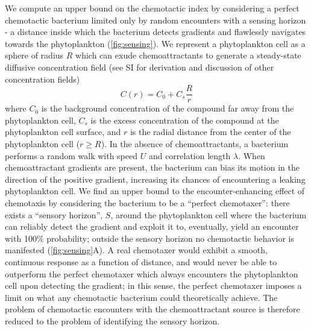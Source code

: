 \documentclass[9pt,twocolumn,twoside]{pnas-new}
\begin{document}
We compute an upper bound on the chemotactic index by considering a perfect chemotactic bacterium limited only by random encounters with a sensing horizon - a distance inside which the bacterium detects gradients and flawlessly navigates towards the phytoplankton (\autoref{fig:sensing}).
We represent a phytoplankton cell as a sphere of radius $R$ which can exude chemoattractants to generate a steady-state diffusive concentration field (see SI for derivation and discussion of other concentration fields)
\begin{equation}\label{eq:chemoattractant_field}
    C(r) = C_0 + C_s \dfrac{R}{r}
\end{equation}
where $C_0$ is the background concentration of the compound far away from the phytoplankton cell, $C_s$ is the excess concentration of the compound at the phytoplankton cell surface, and $r$ is the radial distance from the center of the phytoplankton cell ($r\geq R$).
In the absence of chemoattractants, a bacterium performs a random walk with speed $U$ and correlation length $\lambda$. When chemoattractant gradients are present, the bacterium can bias its motion in the direction of the positive gradient, increasing its chances of encountering a leaking phytoplankton cell. We find an upper bound to the encounter-enhancing effect of chemotaxis by considering the bacterium to be a ``perfect chemotaxer'': there exists a ``sensory horizon'', $S$, around the phytoplankton cell where the bacterium can reliably detect the gradient and exploit it to, eventually, yield an encounter with 100\% probability; outside the sensory horizon no chemotactic behavior is manifested (\autoref{fig:sensing}A).
A real chemotaxer would exhibit a smooth, continuous response as a function of distance, and would never be able to outperform the perfect chemotaxer which always encounters the phytoplankton cell upon detecting the gradient; in this sense, the perfect chemotaxer imposes a limit on what any chemotactic bacterium could theoretically achieve.
The problem of chemotactic encounters with the chemoattractant source is therefore reduced to the problem of identifying the sensory horizon.
\end{document}

